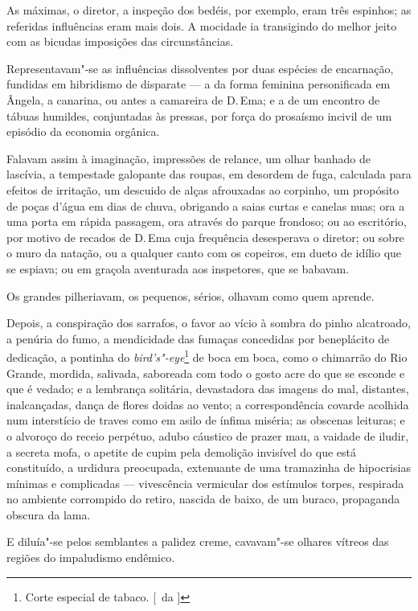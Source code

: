 As máximas, o diretor, a inspeção dos
bedéis, por exemplo, eram três espinhos; as referidas influências eram
mais dois. A mocidade ia transigindo do melhor jeito com as bicudas
imposições das circunstâncias. 

Representavam"-se as influências
dissolventes por duas espécies de encarnação, fundidas em hibridismo de
disparate --- a da forma feminina personificada em Ângela, a canarina,
ou antes a camareira de D.\,Ema; e a de um encontro de tábuas humildes,
conjuntadas às pressas, por força do prosaísmo incivil de um episódio
da economia orgânica. 

Falavam assim à imaginação, impressões de
relance, um olhar banhado de lascívia, a tempestade galopante das
roupas, em desordem de fuga, calculada para efeitos de irritação, um
descuido de alças afrouxadas ao corpinho, um propósito de poças d'água
em dias de chuva, obrigando a saias curtas e canelas nuas; ora a uma
porta em rápida passagem, ora através do parque frondoso; ou ao
escritório, por motivo de recados de D.\,Ema cuja frequência desesperava o diretor;
ou sobre o muro da natação, ou a qualquer canto com os copeiros, em
dueto de idílio que se espiava; ou em graçola aventurada aos
inspetores, que se babavam. 

Os grandes pilheriavam, os pequenos,
sérios, olhavam como quem aprende. 

Depois, a conspiração dos sarrafos,
o favor ao vício à sombra do pinho alcatroado, a penúria do fumo, a
mendicidade das fumaças concedidas por beneplácito de dedicação, a
pontinha do \textit{bird's"-eye}\footnote{ Corte especial de tabaco. [~da ]} 
de boca em boca, como o chimarrão do Rio
Grande, mordida, salivada, saboreada com todo o gosto acre do que se
esconde e que é vedado; e a lembrança solitária, devastadora das
imagens do mal, distantes, inalcançadas, dança de flores doidas ao
vento; a correspondência covarde acolhida num interstício de traves
como em asilo de ínfima miséria; as obscenas leituras; e o alvoroço do
receio perpétuo, adubo cáustico de prazer mau, a vaidade de iludir, a
secreta mofa, o apetite de cupim pela demolição invisível do que está
constituído, a urdidura preocupada, extenuante de uma tramazinha de
hipocrisias mínimas e complicadas --- vivescência vermicular dos
estímulos torpes, respirada no ambiente corrompido do retiro, nascida
de baixo, de um buraco, propaganda obscura da lama. 

E diluía"-se pelos semblantes a palidez creme, cavavam"-se 
olhares vítreos das regiões do impaludismo endêmico. 

